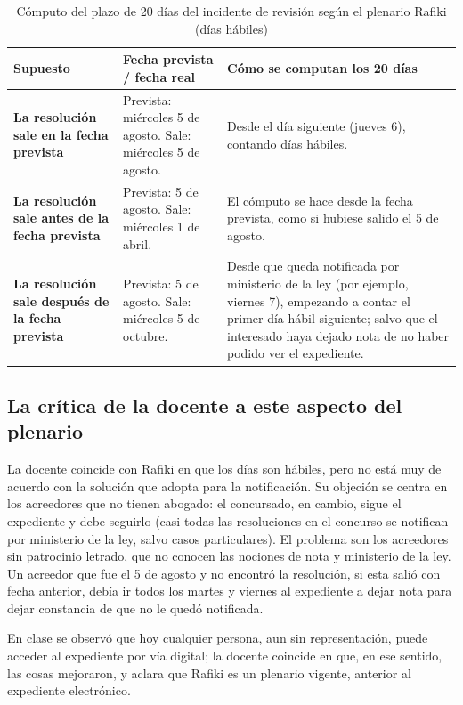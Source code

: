 \documentclass[12pt,oneside]{book}
\begin{document}
\begin{table}[H]
\centering
\small
\caption{Cómputo del plazo de 20 días del incidente de revisión según el plenario Rafiki (días hábiles)}
\begin{tabularx}{\textwidth}{>{\raggedright\arraybackslash\bfseries}p{3.3cm}>{\raggedright\arraybackslash}X>{\raggedright\arraybackslash}X}
\toprule
\textbf{Supuesto} & \textbf{Fecha prevista / fecha real} & \textbf{Cómo se computan los 20 días} \\
\midrule
La resolución sale en la fecha prevista & Prevista: miércoles 5 de agosto. Sale: miércoles 5 de agosto. & Desde el día siguiente (jueves 6), contando días hábiles. \\
\addlinespace
La resolución sale antes de la fecha prevista & Prevista: 5 de agosto. Sale: miércoles 1 de abril. & El cómputo se hace desde la fecha prevista, como si hubiese salido el 5 de agosto. \\
\addlinespace
La resolución sale después de la fecha prevista & Prevista: 5 de agosto. Sale: miércoles 5 de octubre. & Desde que queda notificada por ministerio de la ley (por ejemplo, viernes 7), empezando a contar el primer día hábil siguiente; salvo que el interesado haya dejado nota de no haber podido ver el expediente. \\
\bottomrule
\end{tabularx}
\end{table}

\subsection{La crítica de la docente a este aspecto del plenario}

La docente coincide con Rafiki en que los días son hábiles, pero no está muy de acuerdo con la solución que adopta para la notificación. Su objeción se centra en los acreedores que no tienen abogado: el concursado, en cambio, sigue el expediente y debe seguirlo (casi todas las resoluciones en el concurso se notifican por ministerio de la ley, salvo casos particulares). El problema son los acreedores sin patrocinio letrado, que no conocen las nociones de nota y ministerio de la ley. Un acreedor que fue el 5 de agosto y no encontró la resolución, si esta salió con fecha anterior, debía ir todos los martes y viernes al expediente a dejar nota para dejar constancia de que no le quedó notificada.

En clase se observó que hoy cualquier persona, aun sin representación, puede acceder al expediente por vía digital; la docente coincide en que, en ese sentido, las cosas mejoraron, y aclara que Rafiki es un plenario vigente, anterior al expediente electrónico.
\end{document}
